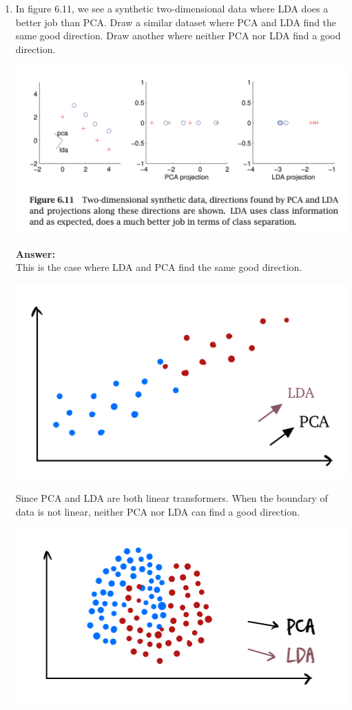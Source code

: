 \documentclass{article}
\begin{document}
\begin{enumerate}
    \item  In figure 6.11, we see a synthetic two-dimensional data where LDA does a better job than PCA. Draw a similar dataset where PCA and LDA find the same good direction. Draw another where neither PCA nor LDA find a good direction.\\ %
    \begin{center}
        \includegraphics[width=0.95\linewidth]{figure 6-11.png}
    \end{center}
    
    \textbf{Answer:} \\
    This is the case where LDA and PCA find the same good direction.
    \begin{center}
        \includegraphics[width=0.6\linewidth]{q7-1.png}
    \end{center}
    
    Since PCA and LDA are both linear transformers. When the boundary of data is not linear, neither PCA nor LDA can find a good direction.
    \begin{center}
        \includegraphics[width=0.6\linewidth]{q7-2.png}
    \end{center}


\end{enumerate}
\end{document}
